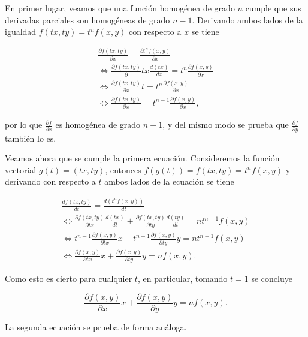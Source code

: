 \documentclass[
  spanish,
  a4paper,
]{scrreport}
\theoremstyle{definition}
\theoremstyle{remark}
\begin{document}
\begin{tcolorbox}[enhanced jigsaw, arc=.35mm, bottomrule=.15mm, bottomtitle=1mm, breakable, colback=white, colbacktitle=quarto-callout-tip-color!10!white, colframe=quarto-callout-tip-color-frame, coltitle=black, left=2mm, leftrule=.75mm, opacityback=0, opacitybacktitle=0.6, rightrule=.15mm, title=\textcolor{quarto-callout-tip-color}{\faLightbulb}\hspace{0.5em}{Solución}, titlerule=0mm, toprule=.15mm, toptitle=1mm]

En primer lugar, veamos que una función homogénea de grado \(n\) cumple
que sus derivadas parciales son homogéneas de grado \(n-1\). Derivando
ambos lados de la igualdad \(f(tx, ty) = t^nf(x,y)\) con respecto a
\(x\) se tiene

\[
\begin{gathered}
\frac{\partial f(tx,ty)}{\partial x} = \frac{\partial t^nf(x,y)}{\partial x} \\
\Leftrightarrow \frac{\partial f(tx,ty)}\partial{tx} \frac{d(tx)}{dx} = t^n  \frac{\partial f(x,y)}{\partial x} \\
\Leftrightarrow \frac{\partial f(tx, ty)}{\partial x} t = t^n \frac{\partial f(x,y)}{\partial x} \\
\Leftrightarrow \frac{\partial f(tx, ty)}{\partial x} = t^{n-1} \frac{\partial f(x,y)}{\partial x}, 
\end{gathered}
\]

por lo que \(\frac{\partial f}{\partial x}\) es homogénea de grado
\(n-1\), y del mismo modo se prueba que
\(\frac{\partial f}{\partial y}\) también lo es.

Veamos ahora que se cumple la primera ecuación. Consideremos la función
vectorial \(g(t)=(tx, ty)\), entonces
\(f(g(t)) = f(tx,ty) = t^n f(x,y)\) y derivando con respecto a \(t\)
ambos lados de la ecuación se tiene

\[
\begin{gathered}
\frac{d f(tx,ty)}{dt} = \frac{d (t^nf(x,y))}{dt} \\
\Leftrightarrow \frac{\partial f(tx,ty)}{\partial tx}\frac{d(tx)}{dt} + \frac{\partial f(tx,ty)}{\partial ty}\frac{d(ty)}{dt} = nt^{n-1}f(x,y)\\
\Leftrightarrow t^{n-1}\frac{\partial f(x,y)}{\partial tx}x + t^{n-1}\frac{\partial f(x,y)}{\partial ty}y =  nt^{n-1}f(x,y) \\
\Leftrightarrow \frac{\partial f(x,y)}{\partial tx}x + \frac{\partial f(x,y)}{\partial ty}y =  nf(x,y).
\end{gathered}
\]

Como esto es cierto para cualquier \(t\), en particular, tomando \(t=1\)
se concluye

\[
\frac{\partial f(x,y)}{\partial x}x + \frac{\partial f(x,y)}{\partial y}y =  nf(x,y).
\]

La segunda ecuación se prueba de forma análoga.

\end{tcolorbox}
\end{document}
